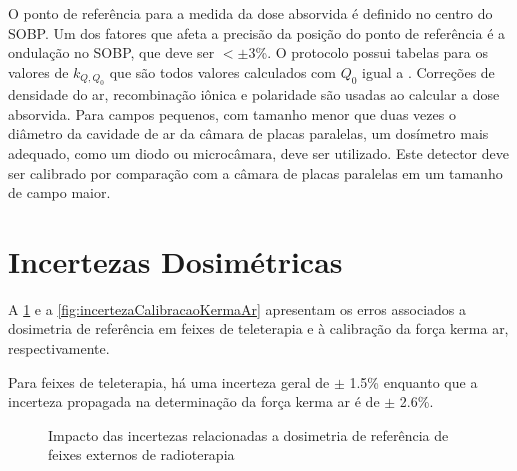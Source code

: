 \documentclass[11pt,a4paper]{article}
\begin{document}
	O ponto de referência para a medida da dose absorvida é definido no centro do SOBP. Um dos fatores que afeta a precisão da posição do ponto de referência é a ondulação no SOBP, que deve ser $< \pm 3$\%. O protocolo possui tabelas para os valores de $k_{Q,Q_0}$ que são todos valores calculados com $Q_0$ igual a . Correções de densidade do ar, recombinação iônica e polaridade são usadas ao calcular a dose absorvida. Para campos pequenos, com tamanho menor que duas vezes o diâmetro da cavidade de ar da câmara de placas paralelas, um dosímetro mais adequado, como um diodo ou microcâmara, deve ser utilizado. Este detector deve ser calibrado por comparação com a câmara de placas paralelas em um tamanho de campo maior.

\section{Incertezas Dosimétricas}

	A \ref{fig:incertezaDosimetricaExternalBeam} e a \ref{fig:incertezaCalibracaoKermaAr} apresentam os erros associados a dosimetria de referência em feixes de teleterapia e à calibração da força kerma ar, respectivamente. 

	Para feixes de teleterapia, há uma incerteza geral de $\pm$ 1.5\% enquanto que a incerteza propagada na determinação da força kerma ar é de $\pm$ 2.6\%.

\begin{figure}[h]
    \centering
    \caption{Impacto das incertezas relacionadas a dosimetria de referência de feixes externos de radioterapia}
    \label{fig:incertezaDosimetricaExternalBeam}
\end{figure}
\end{document}
